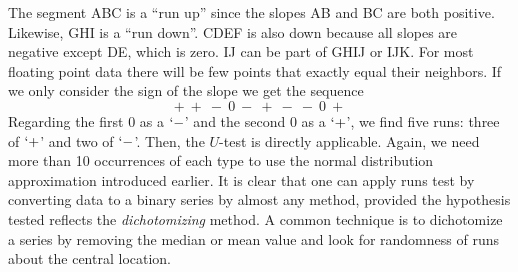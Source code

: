 
The segment ABC is a ``run up'' since the slopes AB and BC are both positive.  Likewise, GHI is a 
``run down''.  CDEF is also down because all slopes are negative except DE, which is zero.  IJ can 
be part of GHIJ or IJK.  For most floating point data there will be few points that exactly equal 
their neighbors.  If we only consider the sign of the slope we get the sequence
$$
+\ +\ -\ 0\ -\ +\ -\ -\ 0\ +
$$
Regarding the first 0 as a $`-$' and the second 0 as a $`+$', we find five runs: three of $`+$' and two of $`-$'.  Then, the $U$-test is directly 
applicable.  Again, we need more than 10 occurrences of each type to use the normal distribution 
approximation introduced earlier.  It is clear that one can apply runs test by converting data to a binary series
by almost any method, provided the hypothesis tested reflects the \emph{dichotomizing} method.  A 
common technique is to dichotomize a series by removing the median or mean value and look 
for randomness of runs about the central location. 
